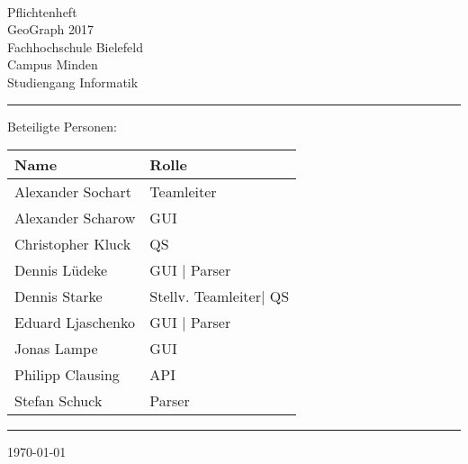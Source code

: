 


\begin{titlepage}
   \mbox{}\vspace{5\baselineskip}\\
   \sffamily\huge
   \centering
   {\Huge Pflichtenheft} \\
   \normalsize GeoGraph 2017
   \vspace{3\baselineskip}\\
   \rmfamily\Large
  Fachhochschule Bielefeld \\
  Campus Minden \\
  Studiengang Informatik
   \vspace{1\baselineskip}\\
\noindent\rule{15cm}{0.3pt}
Beteiligte Personen:
\begin{table}[H]
	\tablestyle
	\begin{tabular}{*{2}{v{0.45\textwidth}}}
		\hline
		\textbf{Name} &
		\textbf{Rolle} \tabularnewline
		\hline
		Alexander Sochart & Teamleiter  \tabularnewline
		Alexander Scharow & GUI\tabularnewline
		Christopher Kluck & QS\tabularnewline
		Dennis Lüdeke & GUI | Parser\tabularnewline
		Dennis Starke  &  Stellv. Teamleiter| QS\tabularnewline
		Eduard Ljaschenko & GUI | Parser\tabularnewline
		Jonas Lampe & GUI \tabularnewline
		Philipp Clausing  & API \tabularnewline
		Stefan Schuck & Parser\tabularnewline
	\end{tabular}
\end{table}
   \noindent\rule{15cm}{0.4pt}

   \today
\end{titlepage}

